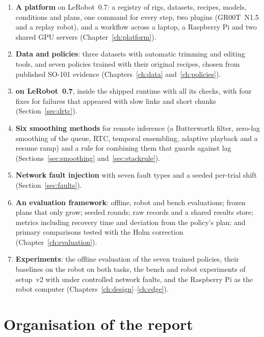 \begin{enumerate}
\item \textbf{A platform} on LeRobot~0.7: a registry of rigs, datasets, recipes, models, conditions and plans, one
      command for every step, two plugins (GR00T~N1.5 and a replay robot), and a workflow across a laptop, a Raspberry Pi
      and two shared GPU servers (Chapter~\ref{ch:platform}).
\item \textbf{Data and policies}: three datasets with automatic trimming and editing tools, and seven policies trained
      with their original recipes, chosen from published SO-101 evidence (Chapters~\ref{ch:data}
      and~\ref{ch:policies}).
\item \textbf{\drtc{} on LeRobot~0.7}, inside the shipped runtime with all its checks, with four fixes for failures
      that appeared with slow links and short chunks (Section~\ref{sec:drtc}).
\item \textbf{Six smoothing methods} for remote inference (a Butterworth filter, zero-lag smoothing of the queue, RTC,
      temporal ensembling, adaptive playback and a resume ramp) and a rule for combining them that guards against lag
      (Sections~\ref{sec:smoothing} and~\ref{sec:stackrule}).
\item \textbf{Network fault injection} with seven fault types and a seeded per-trial shift (Section~\ref{sec:faults}).
\item \textbf{An evaluation framework}: offline, robot and bench evaluations; frozen plans that only grow; seeded
      rounds; raw records and a shared results store; metrics including recovery time and deviation from the policy's
      plan; and primary comparisons tested with the Holm correction (Chapter~\ref{ch:evaluation}).
\item \textbf{Experiments}: the offline evaluation of the seven trained policies, their baselines on the robot on
      both tasks, the bench and robot experiments of setup~v2 with \drtc{} under controlled network faults, and the
      Raspberry Pi as the robot computer (Chapters~\ref{ch:design}--\ref{ch:edge}).
\end{enumerate}

\section{Organisation of the report}

